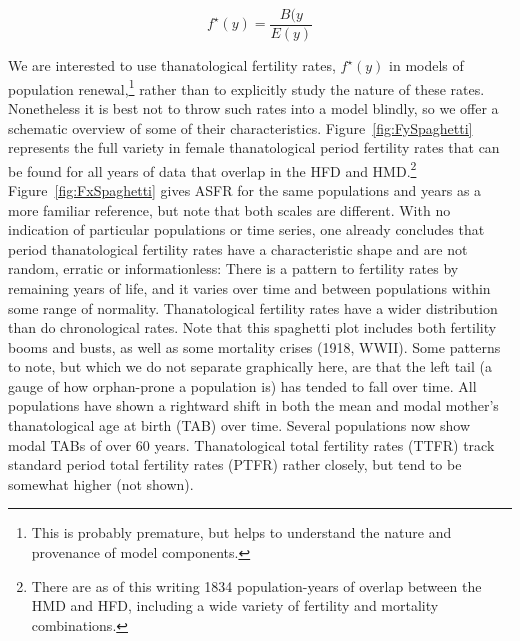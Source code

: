 \documentclass{article}
\begin{document}
\begin{equation}
f^\star(y) = \frac{B(y}{E(y)}
\end{equation}

We are interested to use thanatological fertility rates, $f^\star(y)$ in
models of population renewal,\footnote{This is probably premature, but helps to
understand the nature and provenance of model components.} rather than to
explicitly study the nature of these rates. Nonetheless it is best not to throw such rates into a model blindly, so we offer a schematic overview of some of their characteristics.
Figure~\ref{fig:FySpaghetti} represents the full variety in
female thanatological period fertility rates that can be found for all years
of data that overlap in the HFD and HMD.\footnote{There are as of this writing
1834 population-years of overlap between the HMD and HFD, including a wide
variety of fertility and mortality combinations.} Figure~\ref{fig:FxSpaghetti} gives ASFR for the same
populations and years as a more familiar reference, but note that both scales
are different. With no indication of particular populations or time series, one
already concludes that period thanatological fertility rates have a
characteristic shape and are not random, erratic or informationless: There is a
pattern to fertility rates by remaining years of life, and it varies over time
and between populations within some range of normality. Thanatological fertility
rates have a wider distribution than do chronological rates. Note that this
spaghetti plot includes both fertility booms and busts, as well as some
mortality crises (1918, WWII). Some patterns to note, but which we do not
separate graphically here, are that the left tail (a gauge of how orphan-prone a
population is) has tended to fall over time. All populations have shown a
rightward shift in both the mean and modal mother's thanatological age at birth
(TAB) over time. Several
populations now show modal TABs of over 60 years. Thanatological total fertility rates (TTFR)
track standard period total fertility rates (PTFR) rather closely, but tend to
be somewhat higher (not shown).
\end{document}
